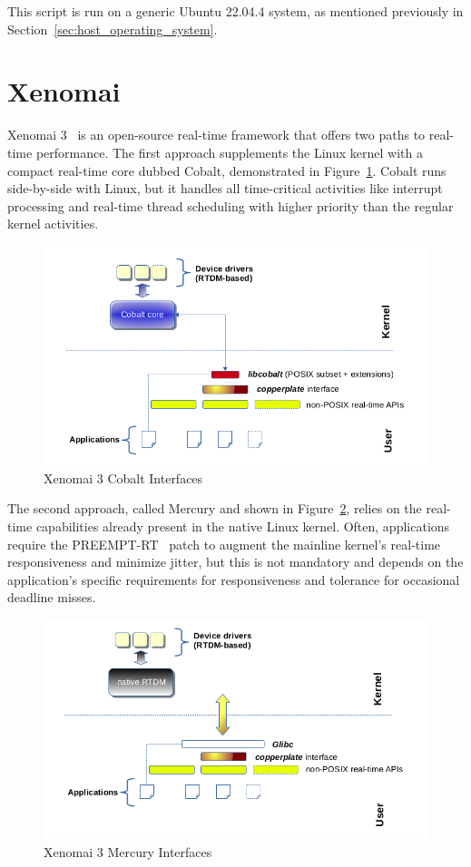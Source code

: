 \documentclass[MMR,Master,english]{style/twbook}
\begin{document}
\noindent This script is run on a generic Ubuntu 22.04.4 system, as mentioned previously in Section~\ref{sec:host_operating_system}.

\clearpage

\section{Xenomai}\label{sec:xenomai}

Xenomai 3~\cite{XenomaiXenomai} is an open-source real-time framework that offers two paths to real-time performance. The first approach supplements the Linux kernel with a compact real-time core dubbed Cobalt, demonstrated in Figure~\ref{fig:cobalt}. Cobalt runs side-by-side with Linux, but it handles all time-critical activities like interrupt processing and real-time thread scheduling with higher priority than the regular kernel activities.

\begin{figure}[H]
	\centering
	\includegraphics[width=0.6\columnwidth]{img/introduction/xenomai/x3-cobalt-interfaces.png}
	\caption[Xenomai 3 Cobalt Interfaces]{Xenomai 3 Cobalt Interfaces~\cite{OverviewXenomai}}
	\label{fig:cobalt}
\end{figure}

\noindent  The second approach, called Mercury and shown in Figure~\ref{fig:mercury}, relies on the real-time capabilities already present in the native Linux kernel. Often, applications require the PREEMPT-RT~\cite{RealtimePreempt_rt_versionsWiki} patch to augment the mainline kernel's real-time responsiveness and minimize jitter, but this is not mandatory and depends on the application's specific requirements for responsiveness and tolerance for occasional deadline misses.

\begin{figure}[H]
	\centering
	\includegraphics[width=0.6\columnwidth]{img/introduction/xenomai/x3-mercury-interfaces.png}
	\caption[Xenomai 3 Mercury Interfaces]{Xenomai 3 Mercury Interfaces~\cite{OverviewXenomai}}
	\label{fig:mercury}
\end{figure}
\end{document}
